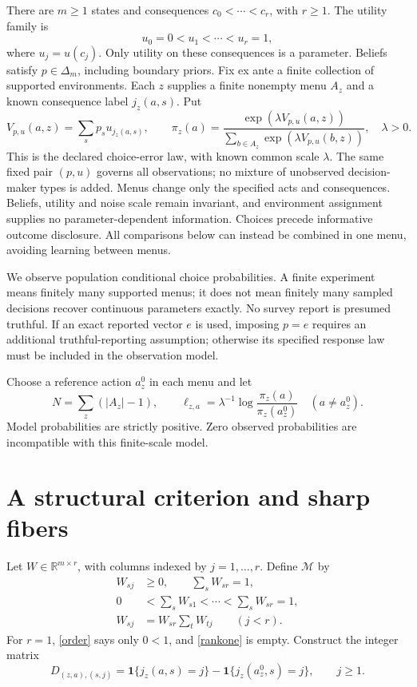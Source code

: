 \documentclass[11pt]{article}
\newcommand{\R}{\mathbb R}
\newcommand{\M}{\mathcal M}
\newcommand{\ind}{\mathbf1}
\begin{document}
There are $m\ge1$ states and consequences $c_0<\cdots<c_r$, with $r\ge1$. The utility family is
\[
 u_0=0<u_1<\cdots<u_r=1,
\]
where $u_j=u(c_j)$. Only utility on these consequences is a parameter. Beliefs satisfy $p\in\Delta_m$, including boundary priors. Fix ex ante a finite collection of supported environments. Each $z$ supplies a finite nonempty menu $A_z$ and a known consequence label $j_z(a,s)$. Put
\[
 V_{p,u}(a,z)=\sum_s p_su_{j_z(a,s)},\qquad
 \pi_z(a)=\frac{\exp(\lambda V_{p,u}(a,z))}
                   {\sum_{b\in A_z}\exp(\lambda V_{p,u}(b,z))},
 \quad \lambda>0.
\]
This is the declared choice-error law, with known common scale $\lambda$. The same fixed pair $(p,u)$ governs all observations; no mixture of unobserved decision-maker types is added. Menus change only the specified acts and consequences. Beliefs, utility and noise scale remain invariant, and environment assignment supplies no parameter-dependent information. Choices precede informative outcome disclosure. All comparisons below can instead be combined in one menu, avoiding learning between menus.

We observe population conditional choice probabilities. A finite experiment means finitely many supported menus; it does not mean finitely many sampled decisions recover continuous parameters exactly. No survey report is presumed truthful. If an exact reported vector $e$ is used, imposing $p=e$ requires an additional truthful-reporting assumption; otherwise its specified response law must be included in the observation model.

Choose a reference action $a_z^0$ in each menu and let
\[
 N=\sum_z(|A_z|-1),\qquad
 \ell_{z,a}=\lambda^{-1}\log\frac{\pi_z(a)}{\pi_z(a_z^0)}
 \quad(a\ne a_z^0).
\]
Model probabilities are strictly positive. Zero observed probabilities are incompatible with this finite-scale model.

\section{A structural criterion and sharp fibers}
Let $W\in\R^{m\times r}$, with columns indexed by $j=1,\ldots,r$. Define $\M$ by
\begin{align}
 W_{sj}&\ge0,\qquad \sum_sW_{sr}=1,\label{normalization}\\
 0&<\sum_sW_{s1}<\cdots<\sum_sW_{sr}=1,\label{order}\\
 W_{sj}&=W_{sr}\sum_tW_{tj}\qquad(j<r).\label{rankone}
\end{align}
For $r=1$, \eqref{order} says only $0<1$, and \eqref{rankone} is empty. Construct the integer matrix
\[
 D_{(z,a),(s,j)}=\ind\{j_z(a,s)=j\}
                    -\ind\{j_z(a_z^0,s)=j\},\qquad j\ge1.
\]
\end{document}
